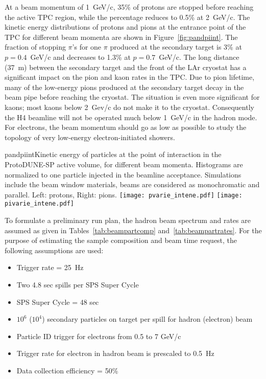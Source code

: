{At a beam momentum of 1~GeV/c, 35\% of protons are stopped before reaching the active TPC region, while the percentage reduces to 0.5\% at 2~GeV/c.  The kinetic energy distributions of protons and pions at the entrance point of the TPC for different beam momenta are shown in Figure~\ref{fig:pandpiint}. 
The fraction of stopping $\pi$'s for one $\pi$
produced at the secondary target is 3\% at $p=0.4$~GeV/c and decreases to 1.3\% at $p=0.7$~GeV/c.
The long distance (37~m) between the secondary target and the front of the LAr cryostat has a significant impact on the pion and kaon rates in the TPC. Due to pion lifetime, many of the  low-energy pions produced at the secondary target decay in the beam pipe before reaching the cryostat. The situation is even more significant for kaons; most kaons below 2~Gev/c do not make it to the cryostat.
Consequently the H4 beamline will not be operated much below 1~GeV/c in the hadron mode.
For electrons, %
the beam momentum should go %
as low as possible to study the topology of very low-energy electron-initiated 
showers.
\begin{cdrfigure}{pandpiint}{Kinetic energy of
    particles at the point of interaction in the ProtoDUNE-SP active
    volume, for different beam momenta. Histograms are normalized to one particle injected in the
    beamline acceptance. Simulations include the beam window
    materials, beams are considered as monochromatic and
    parallel. Left: protons, Right: pions.}
  \texttt{[image: pvarie\_intene.pdf]}
  \texttt{[image: pivarie\_intene.pdf]}
\end{cdrfigure}


To formulate a preliminary run plan, %
the hadron beam spectrum and rates are assumed as given in Tables~\ref{tab:beampartcomp} and~\ref{tab:beampartrates}.   For the purpose of estimating the sample composition and beam time request, the following assumptions are used:
\begin{itemize}
\item { Trigger rate = 25~Hz}
\item { Two 4.8 sec spills per SPS Super Cycle }
\item { SPS Super Cycle = 48 sec}
\item { $10^6$ ($10^4$) secondary particles on target per spill for hadron (electron) beam}
\item { Particle ID trigger for electrons from 0.5 to 7 GeV/c}
\item { Trigger rate for electron in hadron beam is prescaled to 0.5~Hz}
\item { Data collection efficiency = 50\%}
\end{itemize}

}

